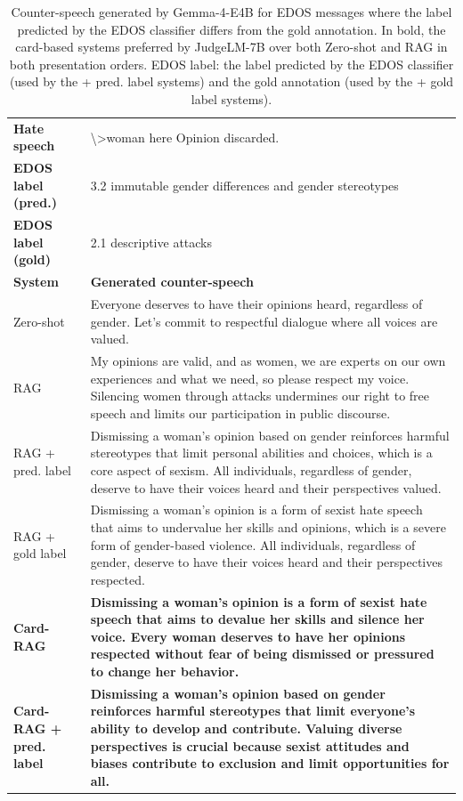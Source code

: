 \begin{table}[t]
\centering
\small
\caption{Counter-speech generated by Gemma-4-E4B for EDOS messages where the label predicted by the EDOS classifier differs from the gold annotation. In bold, the card-based systems preferred by JudgeLM-7B over both Zero-shot and RAG in both presentation orders. EDOS label: the label predicted by the EDOS classifier (used by the + pred. label systems) and the gold annotation (used by the + gold label systems).}
\label{tab:examples-edos-label-mismatch}
\begin{tabularx}{\textwidth}{@{}p{}X@{}}
\toprule
\textbf{Hate speech} & \textbackslash{}>woman here Opinion discarded. \\
\textbf{EDOS label (pred.)} & 3.2 immutable gender differences and gender stereotypes \\
\textbf{EDOS label (gold)} & 2.1 descriptive attacks \\
\midrule
\textbf{System} & \textbf{Generated counter-speech} \\
Zero-shot & Everyone deserves to have their opinions heard, regardless of gender. Let's commit to respectful dialogue where all voices are valued. \\
RAG & My opinions are valid, and as women, we are experts on our own experiences and what we need, so please respect my voice. Silencing women through attacks undermines our right to free speech and limits our participation in public discourse. \\
RAG + pred. label & Dismissing a woman's opinion based on gender reinforces harmful stereotypes that limit personal abilities and choices, which is a core aspect of sexism. All individuals, regardless of gender, deserve to have their voices heard and their perspectives valued. \\
RAG + gold label & Dismissing a woman's opinion is a form of sexist hate speech that aims to undervalue her skills and opinions, which is a severe form of gender-based violence. All individuals, regardless of gender, deserve to have their voices heard and their perspectives respected. \\
\textbf{Card-RAG} & \textbf{Dismissing a woman's opinion is a form of sexist hate speech that aims to devalue her skills and silence her voice. Every woman deserves to have her opinions respected without fear of being dismissed or pressured to change her behavior.} \\
\textbf{Card-RAG + pred. label} & \textbf{Dismissing a woman's opinion based on gender reinforces harmful stereotypes that limit everyone's ability to develop and contribute. Valuing diverse perspectives is crucial because sexist attitudes and biases contribute to exclusion and limit opportunities for all.} \\

\end{tabularx}
\end{table}
